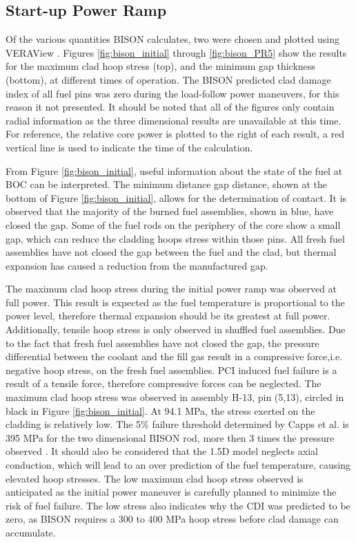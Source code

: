 \documentclass[edeposit,fullpage,11pt]{uiucthesis2009}
\begin{document}
\subsection{Start-up Power Ramp}

Of the various quantities BISON calculates, two were chosen and plotted using VERAView \cite{lee_veraview_2016}.
Figures \ref{fig:bison_initial} through \ref{fig:bison_PR5} show the results for the maximum clad hoop stress (top), and the minimum gap thickness (bottom), at different times of operation. 
The BISON predicted clad damage index of all fuel pins was zero during the load-follow power maneuvers, for this reason it not presented.
It should be noted that all of the figures only contain radial information as the three dimensional results are unavailable at this time. 
For reference, the relative core power is plotted to the right of each result, a red vertical line is used to indicate the time of the calculation.

From Figure \ref{fig:bison_initial}, useful information about the state of the fuel at \gls{BOC}  can be interpreted. 
The minimum distance gap distance, shown at the bottom of Figure \ref{fig:bison_initial}, allows for the determination of contact. 
It is observed that the majority of the burned fuel assemblies, shown in blue, have closed the gap. 
Some of the fuel rods on the periphery of the core show a small gap, which can reduce the cladding hoops stress within those pins.
All fresh fuel assemblies have not closed the gap between the fuel and the clad, but thermal expansion has caused a reduction from the manufactured gap.

The maximum clad hoop stress during the initial power ramp was observed at full power.
This result is expected as the fuel temperature is proportional to the power level, therefore thermal expansion should be its greatest at full power.
Additionally, tensile hoop stress is only observed in shuffled fuel assemblies.
Due to the fact that fresh fuel assemblies have not closed the gap, the pressure differential between the coolant and the fill gas result in a compressive force,i.e.  negative hoop stress, on the fresh fuel assemblies.
\gls{PCI} induced fuel failure is a result of a tensile force, therefore compressive forces can be neglected.
The maximum clad hoop stress was observed in assembly H-13, pin (5,13), circled in black in Figure \ref{fig:bison_initial}. 
At 94.1 MPa, the stress exerted on the cladding is relatively low. 
The 5\% failure threshold determined by Capps et al. is 395 MPa for the two dimensional BISON rod, more then 3 times the pressure observed \cite{capps_pci_2017}.
It should also be considered that the 1.5D model neglects axial conduction, which will lead to an over prediction of the fuel temperature, causing elevated hoop stresses.
The low maximum clad hoop stress observed is anticipated as the initial power maneuver is carefully planned to minimize the risk of fuel failure.
The low stress also indicates why the CDI was predicted to be zero, as BISON requires a 300 to 400 MPa hoop stress before clad damage can accumulate.
\end{document}
